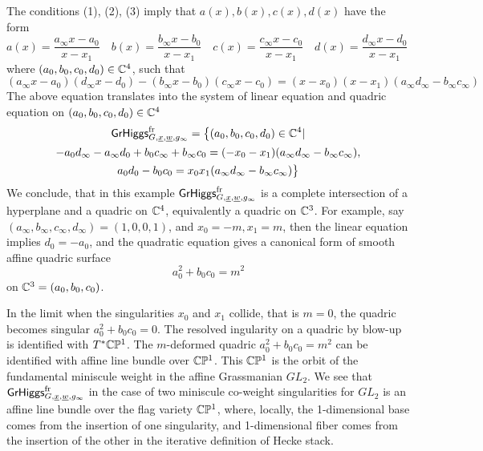 \documentclass[12pt,psamsfonts,reqno]{amsart}
\begin{document}
\begin{proposition}
   The conditions (1), (2), (3) imply that $a(x), b(x), c(x), d(x)$ have the form
   \begin{equation}
     a(x) =  \frac{a_\infty x  - a_0}{x - x_1}\quad
     b(x) = \frac{ b_\infty x  - b_0}{x - x_1}\quad
     c(x) = \frac{ c_\infty  x  - c_0}{x - x_1}\quad
     d(x) = \frac{d_\infty  x  - d_0}{x - x_1}\quad
   \end{equation}
where $ (a_0, b_0, c_0, d_0) \in \mathbb C^4$, 
   such that
   \begin{equation}
 (     a_\infty x - a_0)( d_\infty x - d_0) -   (b_\infty x - b_0)(c_\infty x -c_0) =
     (x - x_0)(x- x_1) (a_\infty d_\infty - b_\infty c_\infty)
   \end{equation}
   The above equation translates into the system of linear
   equation and quadric equation on  $(a_0, b_0, c_0, d_0) \in \mathbb C^4$ 
   \begin{multline}
     \mathsf{GrHiggs}^{\mathrm{fr}}_{G,\underline{x}, \underline{w}, g_\infty} =
\big \{  (a_0, b_0, c_0, d_0) \in \mathbb C^4 | \\
       -a_0 d_\infty - a_\infty d_0 + b_0 c_\infty + b_\infty c_0 
       = ( - x_0 - x_1) (a_\infty d_\infty - b_\infty c_\infty), \\
      a_0 d_0 - b_0 c_0 = 
       x_0 x_1 (a_\infty d_\infty - b_\infty c_\infty) \big \}
     \end{multline}
     We conclude, that in this example $     \mathsf{GrHiggs}^{\mathrm{fr}}_{G,\underline{x}, \underline{w}, g_\infty}$ is a complete intersection of a hyperplane and a  quadric on $\mathbb C^4$, equivalently a quadric on $\mathbb C^3$. For example,
     say $(a_\infty, b_\infty, c_\infty, d_\infty) = (1,0,0,1)$,
     and $x_0 = -m, x_1 = m$, then the linear equation implies $d_0 = -a_0$,
     and the quadratic equation gives a canonical form of smooth affine quadric
     surface 
     \begin{equation}
       \label{eq:quadric}
         a_0^2 + b_0 c_0  = m^2 
     \end{equation}
on  $\mathbb C^3 = (a_0, b_0, c_0)$.
\end{proposition}



\begin{remark}
  In the limit when the singularities $x_0$ and $x_1$ collide, that is $m = 0$,
  the quadric becomes singular $a_0^2 + b_0 c_0 = 0$. The resolved
  ingularity on a quadric by blow-up is identified with $T^{*} \mathbb C \mathbb P^1$.
  The $m$-deformed quadric $a_0^2 + b_0 c_0 = m^2$ can be identified
  with affine line bundle over $\mathbb C \mathbb P^1$. This $\mathbb C \mathbb P^1$ is the orbit
  of the fundamental miniscule weight in the affine Grassmanian $GL_2$.
  We see that $\mathsf{GrHiggs}^{\mathrm{fr}}_{G,\underline{x}, \underline{w}, g_\infty}$
  in the case of two miniscule co-weight singularities for $GL_2$ 
is an affine line bundle over the flag variety $\mathbb C \mathbb P^1$, 
where, locally, the 1-dimensional base comes 
from the insertion of one singularity,
and 1-dimensional fiber comes from the insertion of the other
in the iterative definition of Hecke stack.
\end{remark}
\end{document}

